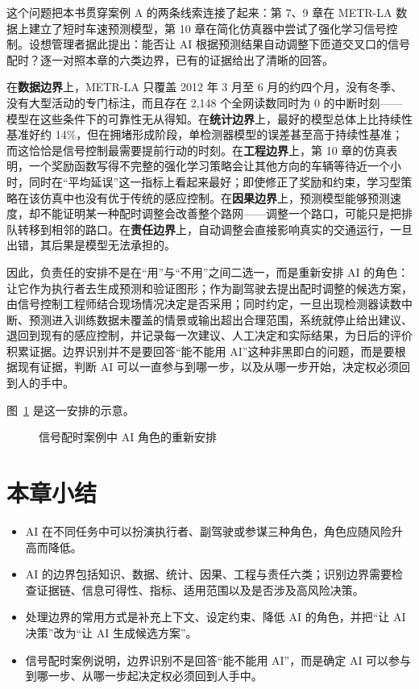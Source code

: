 这个问题把本书贯穿案例 A 的两条线索连接了起来：第 7、9 章在 METR-LA 数据上建立了短时车速预测模型，第 10 章在简化仿真器中尝试了强化学习信号控制。设想管理者据此提出：能否让 AI 根据预测结果自动调整下匝道交叉口的信号配时？逐一对照本章的六类边界，已有的证据给出了清晰的回答。

在\textbf{数据边界}上，METR-LA 只覆盖 2012 年 3 月至 6 月的约四个月，没有冬季、没有大型活动的专门标注，而且存在 2,148 个全网读数同时为 0 的中断时刻——模型在这些条件下的可靠性无从得知。在\textbf{统计边界}上，最好的模型总体上比持续性基准好约 14\%，但在拥堵形成阶段，单检测器模型的误差甚至高于持续性基准；而这恰恰是信号控制最需要提前行动的时刻。在\textbf{工程边界}上，第 10 章的仿真表明，一个奖励函数写得不完整的强化学习策略会让其他方向的车辆等待近一个小时，同时在“平均延误”这一指标上看起来最好；即使修正了奖励和约束，学习型策略在该仿真中也没有优于传统的感应控制。在\textbf{因果边界}上，预测模型能够预测速度，却不能证明某一种配时调整会改善整个路网——调整一个路口，可能只是把排队转移到相邻的路口。在\textbf{责任边界}上，自动调整会直接影响真实的交通运行，一旦出错，其后果是模型无法承担的。

因此，负责任的安排不是在“用”与“不用”之间二选一，而是重新安排 AI 的角色：让它作为执行者去生成预测和验证图形；作为副驾驶去提出配时调整的候选方案，由信号控制工程师结合现场情况决定是否采用；同时约定，一旦出现检测器读数中断、预测进入训练数据未覆盖的情景或输出超出合理范围，系统就停止给出建议、退回到现有的感应控制，并记录每一次建议、人工决定和实际结果，为日后的评价积累证据。边界识别并不是要回答“能不能用 AI”这种非黑即白的问题，而是要根据现有证据，判断 AI 可以一直参与到哪一步，以及从哪一步开始，决定权必须回到人的手中。

图~\ref{fig:ch14_signal} 是这一安排的示意。

\begin{figure}[H]
  \centering
  \caption{信号配时案例中 AI 角色的重新安排}
  \label{fig:ch14_signal}
\end{figure}

\section{本章小结}

\begin{itemize}
  \item AI 在不同任务中可以扮演执行者、副驾驶或参谋三种角色，角色应随风险升高而降低。
  \item AI 的边界包括知识、数据、统计、因果、工程与责任六类；识别边界需要检查证据链、信息可得性、指标、适用范围以及是否涉及高风险决策。
  \item 处理边界的常用方式是补充上下文、设定约束、降低 AI 的角色，并把“让 AI 决策”改为“让 AI 生成候选方案”。
  \item 信号配时案例说明，边界识别不是回答“能不能用 AI”，而是确定 AI 可以参与到哪一步、从哪一步起决定权必须回到人手中。
\end{itemize}

